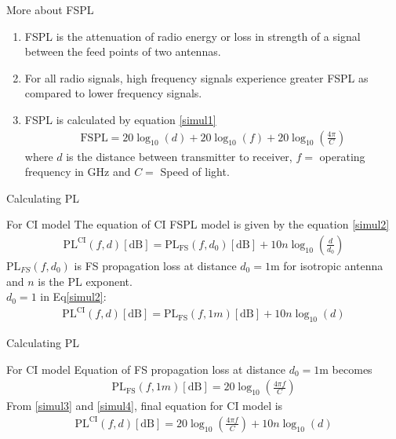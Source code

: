 \documentclass{beamer}
\begin{document}
\begin{frame}{More about FSPL}
 \begin{block}{}
    \begin{enumerate}
        \item FSPL is the attenuation of radio energy or loss in strength of a signal between the feed points of two antennas.
        \item For all radio signals, high frequency signals experience greater FSPL as compared to lower frequency signals.
        \item FSPL is calculated by equation \eqref{simul1}
        \begin{align}
            \text{FSPL} = 20\log_{10}(d) + 20\log_{10}(f) + 20\log_{10}\left(\frac{4\pi}{C}\right) \label{simul1}
        \end{align}
        where $d$ is the distance between transmitter to receiver, $f=$ operating frequency in GHz and $C=$ Speed of light.
    \end{enumerate}
 \end{block}
\end{frame}

\begin{frame}{Calculating PL}
  \begin{block}{For CI model}
   The equation of CI FSPL model is given by the equation \eqref{simul2}
   \begin{align}
       \text{PL}^{\text{CI}}(f,d)[\text{dB}] = \text{PL}_{\text{FS}}(f,d_0)[\text{dB}] + 10n\log_{10}\left(\frac{d}{d_0}\right)  \label{simul2}
   \end{align}
   $\text{PL}_{FS}(f,d_0)$ is FS propagation loss at distance $d_0 = 1$m for isotropic antenna and $n$ is the PL exponent.\\
   $d_0 = 1$ in Eq\eqref{simul2}:
   \begin{align}
       \text{PL}^{\text{CI}}(f,d)[\text{dB}] = \text{PL}_{\text{FS}}(f,1m)[\text{dB}] + 10n\log_{10}(d)  \label{simul3}
   \end{align}
  \end{block}
\end{frame}

\begin{frame}{Calculating PL}
  \begin{block}{For CI model}
     Equation of FS propagation loss at distance $d_0 = 1$m becomes
     \begin{align}
         \text{PL}_{\text{FS}}(f,1m)[\text{dB}] = 20\log_{10}\left(\frac{4\pi f}{C}\right) \label{simul4}
     \end{align}
     From \eqref{simul3} and \eqref{simul4}, final equation for CI model is
     \begin{align}
        \text{PL}^{\text{CI}}(f,d)[\text{dB}] = 20\log_{10}\left(\frac{4\pi f}{C}\right) + 10n\log_{10}(d) \label{simul5}
     \end{align}
  \end{block}
\end{frame}
\end{document}
